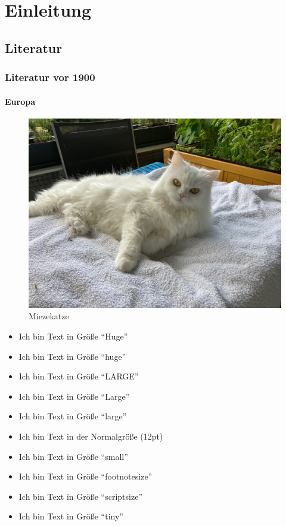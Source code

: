 \chapter{Einleitung}

\section{Literatur}
\subsection{Literatur vor 1900}


\subsubsection{Europa}

\blindtext 

\begin{figure}[tb]
\includegraphics[width=\textwidth]{./Bilder/Katze1.jpg}
\caption{Miezekatze}\label{fig:miezekatze}
\end{figure}

\blindtext

\begin{itemize}
\item {\Huge Ich bin Text in Größe \enquote{Huge}}
\item {\huge Ich bin Text in Größe \enquote{huge}}
\item {\LARGE Ich bin Text in Größe \enquote{LARGE}}
\item {\Large Ich bin Text in Größe \enquote{Large}}
\item {\large Ich bin Text in Größe \enquote{large}}
\item {\normalsize Ich bin Text in der Normalgröße (12pt)}
\item {\small Ich bin Text in Größe \enquote{small}}
\item {\footnotesize Ich bin Text in Größe \enquote{footnotesize}}
\item {\scriptsize Ich bin Text in Größe \enquote{scriptsize}}
\item {\tiny Ich bin Text in Größe \enquote{tiny}}
\end{itemize}



